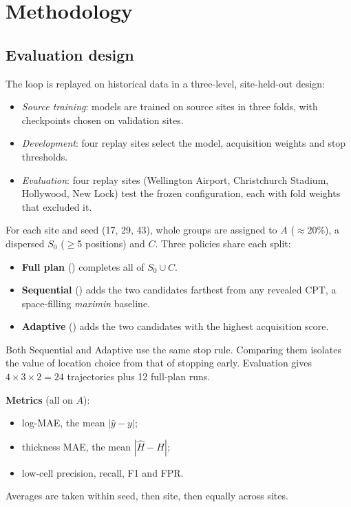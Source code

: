 \section{Methodology}

\subsection{Evaluation design}
The loop is replayed on historical data in a three-level, site-held-out design:
\begin{itemize}
\item \emph{Source training}: models are trained on source sites in three folds, with checkpoints chosen on
  validation sites.
\item \emph{Development}: four replay sites select the model, acquisition weights and stop thresholds.
\item \emph{Evaluation}: four replay sites (Wellington Airport, Christchurch Stadium, Hollywood, New Lock)
  test the frozen configuration, each with fold weights that excluded it.
\end{itemize}
For each site and seed (17, 29, 43), whole groups are assigned to $A$ ($\approx$20\%), a dispersed $S_0$
($\geq$5 positions) and $C$. Three policies share each split:
\begin{itemize}
\item \textbf{Full plan} (\Bfull) completes all of $S_0\cup C$.
\item \textbf{Sequential} (\Bseq) adds the two candidates farthest from any revealed CPT, a space-filling
  \emph{maximin} baseline.
\item \textbf{Adaptive} (\Padapt) adds the two candidates with the highest acquisition score.
\end{itemize}
Both Sequential and Adaptive use the same stop rule. Comparing them isolates the value of location choice
from that of stopping early. Evaluation gives $4\times3\times2=24$ trajectories plus 12 full-plan runs.

\textbf{Metrics} (all on $A$):
\begin{itemize}
\item log-MAE, the mean $|\hat y-y|$;
\item thickness MAE, the mean $|\hat H-H|$;
\item low-cell precision, recall, F1 and FPR.
\end{itemize}
Averages are taken within seed, then site, then equally across sites.


